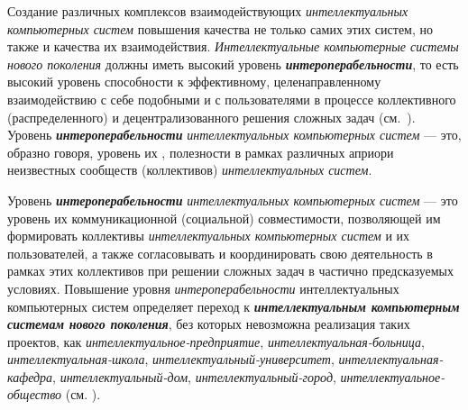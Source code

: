 Создание различных комплексов взаимодействующих \textit{интеллектуальных компьютерных систем}  повышения качества не только самих этих систем, но также и качества их взаимодействия. \textit{Интеллектуальные компьютерные системы нового поколения} должны иметь высокий уровень \textbf{\textit{интероперабельности}}, то есть высокий уровень способности к эффективному, целенаправленному взаимодействию с себе подобными и с пользователями в процессе коллективного (распределенного) и децентрализованного решения сложных задач (см.~). Уровень \textbf{\textit{интероперабельности}} \textit{интеллектуальных компьютерных систем} --- это, образно говоря, уровень их , полезности в рамках различных априори неизвестных сообществ (коллективов) \textit{интеллектуальных систем}.

Уровень \textbf{\textit{интероперабельности}} \textit{интеллектуальных компьютерных систем} --- это уровень их коммуникационной (социальной) совместимости, позволяющей им  формировать коллективы \textit{интеллектуальных компьютерных систем} и их пользователей, а также  согласовывать и координировать свою деятельность в рамках этих коллективов при решении сложных задач в частично предсказуемых условиях. Повышение уровня \textit{интероперабельности} интеллектуальных компьютерных систем определяет переход к \textbf{\textit{интеллектуальным компьютерным системам нового поколения}}, без которых невозможна реализация таких проектов, как \textit{интеллектуальное-предприятие}, \textit{интеллектуальная-больница}, \textit{интеллектуальная-школа}, \textit{интеллектуальный-университет}, \textit{интеллектуальная-кафедра}, \textit{интеллектуальный-дом}, \textit{интеллектуальный-город}, \textit{интеллектуаль\-ное-общество} (см. ).

